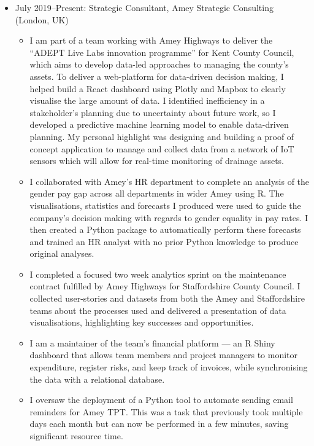 \documentclass[11pt, a4paper]{article}
\begin{document}
\begin{itemize}
	\item July 2019--Present: Strategic Consultant, Amey Strategic Consulting (London, UK)
	\begin{itemize}
		\item I am part of a team working with Amey Highways to deliver the \enquote{ADEPT Live Labs innovation programme} for Kent County Council, which aims to develop data-led approaches to managing the county's assets.
		To deliver a web-platform for data-driven decision making, I helped build a React dashboard using Plotly and Mapbox to clearly visualise the large amount of data.
		I identified inefficiency in a stakeholder's planning due to uncertainty about future work, so I developed a predictive machine learning model to enable data-driven planning.
		My personal highlight was designing and building a proof of concept application to manage and collect data from a network of IoT sensors which will allow for real-time monitoring of drainage assets.
		
		\item I collaborated with Amey's HR department to complete an analysis of the gender pay gap across all departments in wider Amey using R.
		The visualisations, statistics and forecasts I produced were used to guide the company's decision making with regards to gender equality in pay rates.
		I then created a Python package to automatically perform these forecasts and trained an HR analyst with no prior Python knowledge to produce original analyses.
		
		\item I completed a focused two week analytics sprint on the maintenance contract fulfilled by Amey Highways for Staffordshire County Council.
		I collected user-stories and datasets from both the Amey and Staffordshire teams about the processes used and delivered a presentation of data visualisations, highlighting key successes and opportunities.
		
		\item I am a maintainer of the team's financial platform --- an R Shiny dashboard that allows team members and project managers to monitor expenditure, register risks, and keep track of invoices, while synchronising the data with a relational database.

		\item I oversaw the deployment of a Python tool to automate sending email reminders for Amey TPT.
		This was a task that previously took multiple days each month but can now be performed in a few minutes, saving significant resource time.
	\end{itemize}


\end{itemize}
\end{document}
